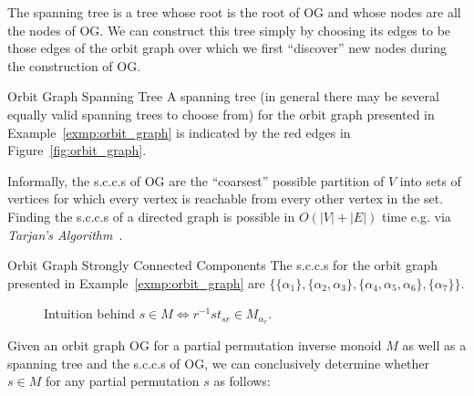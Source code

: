 The spanning tree is a tree whose root is the root of $\mathrm{OG}$ and whose
nodes are all the nodes of $\mathrm{OG}$. We can construct this tree simply by
choosing its edges to be those edges of the orbit graph over which we first
``discover'' new nodes during the construction of $\mathrm{OG}$.

\begin{exmp}{Orbit Graph Spanning Tree}
  A spanning tree (in general there may be several equally valid spanning trees
  to choose from) for the orbit graph presented in Example~\ref{exmp:orbit_graph}
  is indicated by the red edges in Figure~\ref{fig:orbit_graph}.
\end{exmp}
%
Informally, the s.c.c.s of $\mathrm{OG}$ are the ``coarsest'' possible
partition of $V$ into sets of vertices for which every vertex is reachable from
every other vertex in the set. Finding the s.c.c.s of a directed graph is
possible in $O(|V| + |E|)$ time e.g.  via \textit{Tarjan's
Algorithm}~\cite{Tarjan}.

\begin{exmp}{Orbit Graph Strongly Connected Components}
  The s.c.c.s for the orbit graph presented in
  Example~\ref{exmp:orbit_graph} are $\{\{\alpha_1\},\{\alpha_2,\alpha_3\},
  \{\alpha_4,\alpha_5,\alpha_6\},\{\alpha_7\}\}$.
\end{exmp}

\begin{figure}
  \centering
  \caption{Intuition behind $s \in M \iff r^{-1} s t_{sr} \in M_{\alpha_r}$.}
  \label{fig:is_member_partial}
\end{figure}

\noindent
Given an orbit graph $\mathrm{OG}$ for a partial permutation inverse monoid $M$
as well as a spanning tree and the s.c.c.s of $\mathrm{OG}$, we can conclusively
determine whether $s \in M$ for any partial permutation $s$ as follows:

